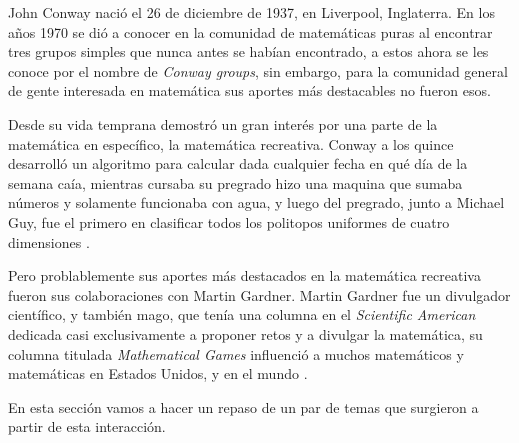 John Conway naci\'o el 26 de diciembre de 1937, en Liverpool, Inglaterra. En los a\~nos 1970 se di\'o a conocer en la comunidad de matem\'aticas puras al encontrar tres grupos simples que nunca antes se hab\'ian encontrado, a estos ahora se les conoce por el nombre de \textit{Conway groups}, sin embargo, para la comunidad general de gente interesada en matem\'atica sus aportes m\'as destacables no fueron esos.

Desde su vida temprana demostr\'o un gran inter\'es por una parte de la matem\'atica en espec\'ifico, la matem\'atica recreativa. Conway a los quince desarroll\'o un algoritmo para calcular dada cualquier fecha en qu\'e d\'ia de la semana ca\'ia, mientras cursaba su pregrado hizo una maquina que sumaba n\'umeros y solamente funcionaba con agua, y luego del pregrado, junto a Michael Guy, fue el primero en clasificar todos los politopos uniformes de cuatro dimensiones \cite{Roberts2015-ur}.

Pero problablemente sus aportes m\'as destacados en la matem\'atica recreativa fueron sus colaboraciones con Martin Gardner. Martin Gardner fue un divulgador cient\'ifico, y tambi\'en mago, que ten\'ia una columna en el \textit{Scientific American} dedicada casi exclusivamente a proponer retos y a divulgar la matem\'atica, su columna titulada \textit{Mathematical Games} influenci\'o a muchos matem\'aticos y matem\'aticas en Estados Unidos, y en el mundo \cite{Gardner1999}.

En esta secci\'on vamos a hacer un repaso de un par de temas que surgieron a partir de esta interacci\'on.